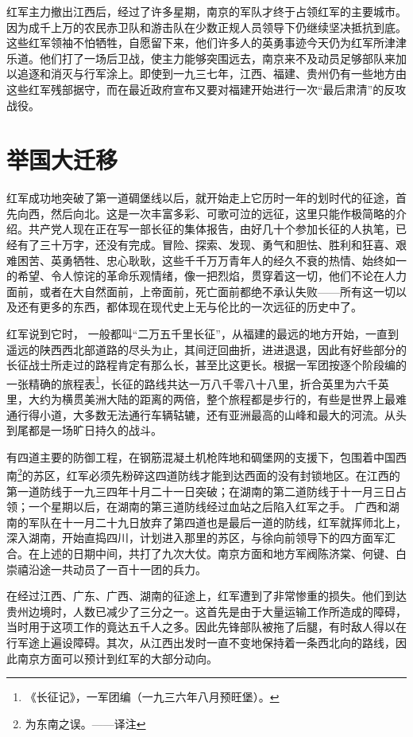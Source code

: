 \documentclass[10pt]{book}
\begin{document}
红军主力撤出江西后，经过了许多星期，南京的军队才终于占领红军的主要城市。因为成千上万的农民赤卫队和游击队在少数正规人员领导下仍继续坚决抵抗到底。这些红军领袖不怕牺牲，自愿留下来，他们许多人的英勇事迹今天仍为红军所津津乐道。他们打了一场后卫战，使主力能够突围远去，南京来不及动员足够部队来加以追逐和消灭与行军涂上。即使到一九三七年，江西、福建、贵州仍有一些地方由这些红军残部据守，而在最近政府宣布又要对福建开始进行一次“最后肃清”的反攻战役。

\section{举国大迁移}

红军成功地突破了第一道碉堡线以后，就开始走上它历时一年的划时代的征途，首先向西，然后向北。这是一次丰富多彩、可歌可泣的远征，这里只能作极简略的介绍。共产党人现在正在写一部长征的集体报告，由好几十个参加长征的人执笔，已经有了三十万字，还没有完成。冒险、探索、发现、勇气和胆怯、胜利和狂喜、艰难困苦、英勇牺牲、忠心耿耿，这些千千万万青年人的经久不衰的热情、始终如一的希望、令人惊诧的革命乐观情绪，像一把烈焰，贯穿着这一切，他们不论在人力面前，或者在大自然面前，上帝面前，死亡面前都绝不承认失败——所有这一切以及还有更多的东西，都体现在现代史上无与伦比的一次远征的历史中了。

红军说到它时， 一般都叫“二万五千里长征”，从福建的最远的地方开始，一直到遥远的陕西西北部道路的尽头为止，其间迂回曲折，进进退退，因此有好些部分的长征战士所走过的路程肯定有那么长，甚至比这更长。根据一军团按逐个阶段编的一张精确的旅程表\footnote{《长征记》，一军团编（一九三六年八月预旺堡）。}，长征的路线共达一万八千零八十八里，折合英里为六千英里，大约为横贯美洲大陆的距离的两倍，整个旅程都是步行的，有些是世界上最难通行得小道，大多数无法通行车辆轱辘，还有亚洲最高的山峰和最大的河流。从头到尾都是一场旷日持久的战斗。

有四道主要的防御工程，在钢筋混凝土机枪阵地和碉堡网的支援下，包围着中国西南\footnote{为东南之误。——译注}的苏区，红军必须先粉碎这四道防线才能到达西面的没有封锁地区。在江西的第一道防线于一九三四年十月二十一日突破；在湖南的第二道防线于十一月三日占领；一个星期以后，在湖南的第三道防线经过血站之后陷入红军之手。 广西和湖南的军队在十一月二十九日放弃了第四道也是最后一道的防线，红军就挥师北上，深入湖南，开始直捣四川，计划进入那里的苏区，与徐向前领导下的四方面军汇合。在上述的日期中间，共打了九次大仗。南京方面和地方军阀陈济棠、何键、白崇禧沿途一共动员了一百十一团的兵力。

在经过江西、广东、广西、湖南的征途上，红军遭到了非常惨重的损失。他们到达贵州边境时，人数已减少了三分之一。这首先是由于大量运输工作所造成的障碍，当时用于这项工作的竟达五千人之多。因此先锋部队被拖了后腿，有时敌人得以在行军途上遍设障碍。其次，从江西出发时一直不变地保持着一条西北向的路线，因此南京方面可以预计到红军的大部分动向。
\end{document}
